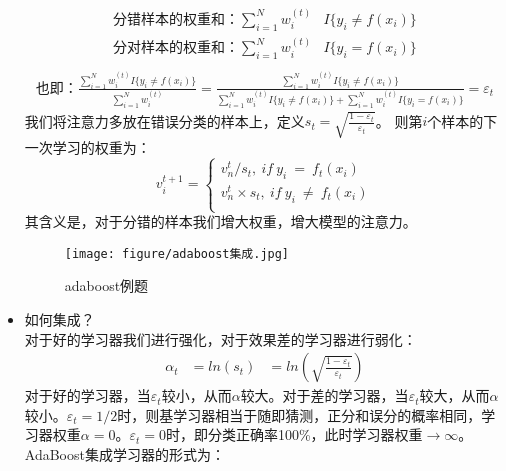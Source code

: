 \documentclass[twoside]{article}
\begin{document}
\begin{itemize}
        \begin{equation*}
            \begin{aligned}
                \text{分错样本的权重和：}\sum_{i=1}^N w_i^{(t)} &I\{y_i \neq f(x_i)\}\\
                \text{分对样本的权重和：}\sum_{i=1}^N w_i^{(t)} &I\{y_i = f(x_i)\}\\
            \end{aligned}
        \end{equation*}
        \begin{equation*}
            \begin{aligned}
                \text{也即：}\frac{\sum_{i=1}^N w_i^{(t)} I\{y_i \neq f(x_i)\}}{\sum_{i=1}^N w_i^{(t)}}=\frac{\sum_{i=1}^N w_i^{(t)} I\{y_i \neq f(x_i)\}}{\sum_{i=1}^N w_i^{(t)} I\{y_i \neq f(x_i)\}+\sum_{i=1}^N w_i^{(t)} I\{y_i = f(x_i)\}}=\varepsilon_t
            \end{aligned}
        \end{equation*}
        我们将注意力多放在错误分类的样本上，定义$s_t=\sqrt{\frac{1-\varepsilon_t}{\varepsilon_t}}$。
        则第$i$个样本的下一次学习的权重为：
        \begin{equation*}
            v_i^{t+1}=\left\{ \begin{array}{l}
                v_{n}^{t}/s_t,\ if\ y_i\ =\ f_t\left( x_i \right)\\
                v_{n}^{t}\times s_t,\ if\ y_i\ \ne \ f_t\left( x_i \right)\\
            \end{array} \right. 
        \end{equation*}
        其含义是，对于分错的样本我们增大权重，增大模型的注意力。\begin{figure}[h]
    \centering
    \texttt{[image: figure/adaboost集成.jpg]}
    \caption{adaboost例题}
\end{figure}
\item 如何集成？\\
对于好的学习器我们进行强化，对于效果差的学习器进行弱化：
\begin{equation*}
    \begin{aligned}
    \alpha_t&=ln(s_t)
    &=ln\left(\sqrt{\frac{1-\varepsilon_t}{\varepsilon_t}}\right)   
    \end{aligned}
\end{equation*}
对于好的学习器，当$\varepsilon_t$较小，从而$\alpha$较大。对于差的学习器，当$\varepsilon_t$较大，从而$\alpha$较小。$\varepsilon_t=1/2$时，则基学习器相当于随即猜测，正分和误分的概率相同，学习器权重$\alpha=0$。$\varepsilon_t=0$时，即分类正确率100\%，此时学习器权重$\to \infty$。AdaBoost集成学习器的形式为：

\end{itemize}
\end{document}
